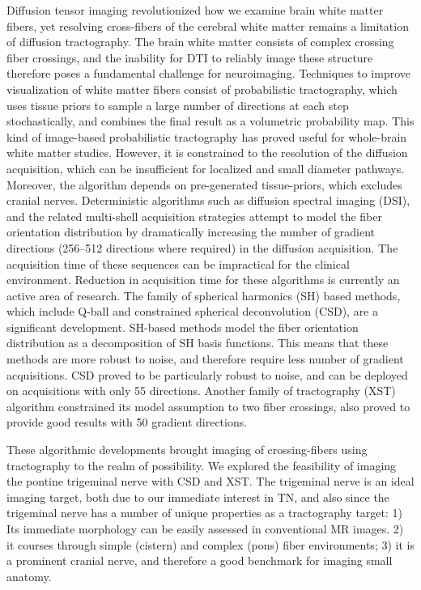 Diffusion tensor imaging revolutionized how we examine brain white matter fibers, yet resolving cross-fibers of the cerebral white matter remains a limitation of diffusion tractography. The brain white matter consists of complex crossing fiber crossings, and the inability for DTI to reliably image these structure therefore poses a fundamental challenge for neuroimaging.
Techniques to improve visualization of white matter fibers consist of probabilistic tractography, which uses tissue priors to sample a large number of directions at each step stochastically, and combines the final result as a volumetric probability map. This kind of image-based probabilistic tractography has proved useful for whole-brain white matter studies. However, it is constrained to the resolution of the diffusion acquisition, which can be insufficient for localized and small diameter pathways. Moreover, the algorithm depends on pre-generated tissue-priors, which excludes cranial nerves. 
Deterministic algorithms such as diffusion spectral imaging (DSI), and the related multi-shell acquisition strategies attempt to model the fiber orientation distribution by dramatically increasing the number of gradient directions (256--512 directions where required) in the diffusion acquisition. The acquisition time of these sequences can be impractical for the clinical environment. Reduction in acquisition time for these algorithms is currently an active area of research.
The family of spherical harmonics (SH) based methods, which include Q-ball and constrained spherical deconvolution (CSD), are a significant development. SH-based methods model the fiber orientation distribution as a decomposition of SH basis functions. This means that these methods are more robust to noise, and therefore require less number of gradient acquisitions. CSD proved to be particularly robust to noise, and can be deployed on acquisitions with only 55 directions. Another family of tractography (XST) algorithm constrained its model assumption to two fiber crossings, also proved to provide good results with 50 gradient directions.

These algorithmic developments brought imaging of crossing-fibers using tractography to the realm of possibility. We explored the feasibility of imaging the pontine trigeminal nerve with CSD and XST. The trigeminal nerve is an ideal imaging target, both due to our immediate interest in TN, and also since the trigeminal nerve has a number of unique properties as a tractography target: 1) Its immediate morphology can be easily assessed in conventional MR images. 2) it courses through simple (cistern) and complex (pons) fiber environments; 3) it is a prominent cranial nerve, and therefore a good benchmark for imaging small anatomy.

